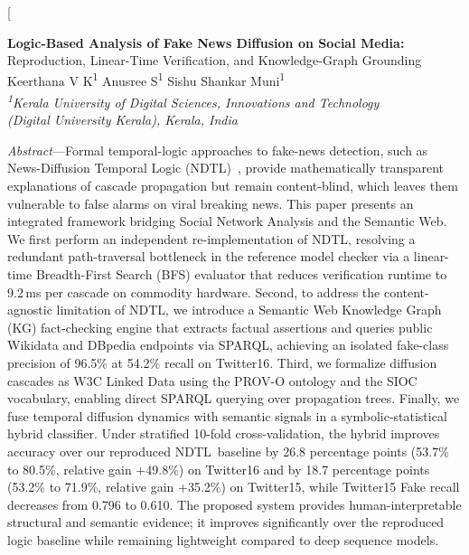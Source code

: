 \documentclass[10pt,twocolumn,a4paper]{article}
\newcommand{\NDTL}{\textsc{NDTL}}
\begin{document}
 
\twocolumn[{%
\begin{@twocolumnfalse}
\begin{center}
{\fontsize{19}{23}\selectfont \textbf{Logic-Based Analysis of Fake News Diffusion on Social Media:}}\\[4pt]
{\fontsize{13}{17}\selectfont Reproduction, Linear-Time Verification, and Knowledge-Graph Grounding}\\[10pt]
{\large Keerthana V K\textsuperscript{1}\hspace{2em} Anusree S\textsuperscript{1}\hspace{2em} Sishu Shankar Muni\textsuperscript{1}}\\[4pt]
{\small\itshape \textsuperscript{1}Kerala University of Digital Sciences, Innovations and Technology\\ (Digital University Kerala), Kerala, India}
\end{center}
\vspace{4pt}
\begin{center}
\begin{minipage}{0.92\textwidth}
\footnotesize
\noindent\textit{Abstract}---Formal temporal-logic approaches to fake-news detection, such as News-Diffusion Temporal Logic (\NDTL)~\cite{fionda2025}, provide mathematically transparent explanations of cascade propagation but remain content-blind, which leaves them vulnerable to false alarms on viral breaking news. This paper presents an integrated framework bridging Social Network Analysis and the Semantic Web. We first perform an independent re-implementation of \NDTL, resolving a redundant path-traversal bottleneck in the reference model checker via a linear-time Breadth-First Search (BFS) evaluator that reduces verification runtime to 9.2\,ms per cascade on commodity hardware. Second, to address the content-agnostic limitation of \NDTL, we introduce a Semantic Web Knowledge Graph (KG) fact-checking engine that extracts factual assertions and queries public Wikidata and DBpedia endpoints via SPARQL, achieving an isolated fake-class precision of 96.5\% at 54.2\% recall on Twitter16. Third, we formalize diffusion cascades as W3C Linked Data using the PROV-O ontology and the SIOC vocabulary, enabling direct SPARQL querying over propagation trees. Finally, we fuse temporal diffusion dynamics with semantic signals in a symbolic-statistical hybrid classifier. Under stratified 10-fold cross-validation, the hybrid improves accuracy over our reproduced \NDTL\ baseline by 26.8 percentage points (53.7\% to 80.5\%, relative gain +49.8\%) on Twitter16 and by 18.7 percentage points (53.2\% to 71.9\%, relative gain +35.2\%) on Twitter15, while Twitter15 Fake recall decreases from 0.796 to 0.610. The proposed system provides human-interpretable structural and semantic evidence; it improves significantly over the reproduced logic baseline while remaining lightweight compared to deep sequence models.
 

\end{minipage}
\end{center}
\end{@twocolumnfalse}}
\end{document}
